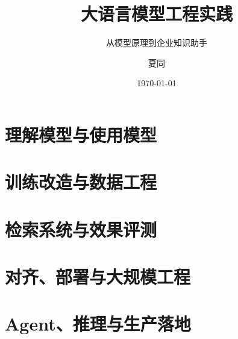 \documentclass[lang=cn,11pt]{elegantbook}
\title{大语言模型工程实践}
\subtitle{从模型原理到企业知识助手}
\author{夏同}
\date{\today}
\begin{document}
\maketitle
\frontmatter
\tableofcontents
\cleardoublepage
{}
{}
\markboth{\listexercisename}{\listexercisename}
\listofexercises
\cleardoublepage
\mainmatter
\part{理解模型与使用模型}




\part{训练改造与数据工程}


\part{检索系统与效果评测}



\part{对齐、部署与大规模工程}



\part{Agent、推理与生产落地}




\end{document}
